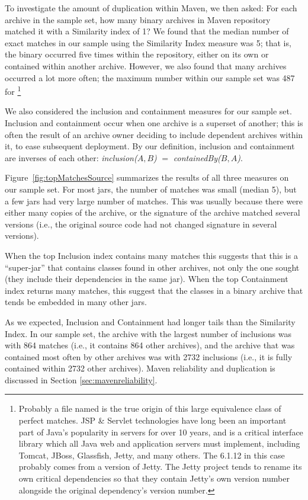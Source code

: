 To investigate the amount of duplication within Maven, we then asked:  For
each archive in the sample set, how many binary archives in Maven
repository matched it with a Similarity index of 1?  We found that the
median number of exact matches in our sample using the Similarity Index
measure was 5; that is, the binary occurred five times within the
repository, either on its own or contained within another archive.
However, we also found that many archives occurred a lot more often; the
maximum number within our sample set was 487 for
\footnote{Probably a file named
 is the true origin of this large equivalence
class of perfect matches.  JSP \& Servlet technologies have long been
an important part of Java's popularity in servers for over 10 years,
and  is a critical interface library
which all Java web and application servers must implement, including Tomcat, JBoss,
Glassfish, Jetty, and many others.  The 6.1.12 in this case probably
comes from a version of Jetty.  The Jetty project tends to rename its own critical
dependencies so that they contain Jetty's own version number alongside
the original dependency's version number.}

We also considered the inclusion and containment measures for our sample
set.  Inclusion and containment occur when one archive is a superset of another; this is
often the result of an archive owner deciding to include dependent archives
within it, to ease subsequent deployment.
By our definition, inclusion and containment are inverses of each other:
\emph{inclusion($A,B$)} $=$ \emph{containedBy($B,A$)}.

Figure~\ref{fig:topMatchesSource} summarizes the results of all three
measures on our sample set.  For most jars, the number of matches was small
(median 5), but a few jars had very large number of matches. This was
usually because there were either many copies of the archive, or
the signature of the archive matched several versions (i.e., the original
source code had not changed signature in several versions).

When the top Inclusion index contains many matches this suggests that this
is a ``super-jar'' that contains classes found in other archives, not only
the one sought (they include their dependencies in the same jar).  When the
top Containment index returns many matches, this suggest that the classes
in a binary archive that tends be embedded in many other jars.

As we expected, Inclusion and Containment had longer tails than the
Similarity Index.  In our sample set, the archive with the largest number
of inclusions was  with
864 matches (i.e., it contains 864 other archives), and the archive that
was contained most often by other archives was
 with 2732
inclusions (i.e., it is fully contained within 2732 other archives).  Maven
reliability and duplication is discussed in Section
\ref{sec:mavenreliability}.

